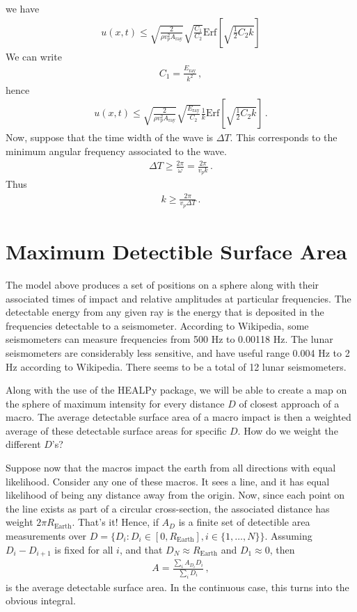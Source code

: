 \documentclass{article}
\newcommand*\te[1]{\text{#1}}
\newcommand*\ps[1]{\left[#1\right]}
\newcommand*\f[2]{\frac{#1}{#2}}
\begin{document}
we have
\begin{align}
u(x,t) \leq \sqrt{\f{2}{\rho v_p^2 A_{\te{ray}}}}\sqrt{\f{C_1}{C_2}}\te{Erf}\ps{\sqrt{\f12 C_2 k}}
\end{align}
We can write
\begin{align}
C_1 = \f{E_\te{ray}}{k^2}\,,
\end{align}
hence
\begin{align}
u(x,t) \leq \sqrt{\f{2}{\rho v_p^2 A_{\te{ray}}}}\sqrt{\f{E_\te{ray}}{C_2}}\f1k\te{Erf}\ps{\sqrt{\f12 C_2 k}}\,.
\end{align}
Now, suppose that the time width of the wave is $\Delta T$. This corresponds to the minimum angular frequency associated to the wave. 
\begin{align}
\Delta T \geq \f{2\pi}{\omega} = \f{2\pi}{v_p k}\,.
\end{align}
Thus
\begin{align}
k \geq\f{2\pi}{v_p\Delta T}\,.
\end{align}
\pagebreak
\section{Maximum Detectible Surface Area}
\indent

The model above produces a set of positions on a sphere along with their associated times of impact and relative amplitudes at particular frequencies. The detectable energy from any given ray is the energy that is deposited in the frequencies detectable to a seismometer. According to Wikipedia, some seismometers can measure frequencies from 500 Hz to 0.00118 Hz. The lunar seismometers are considerably less sensitive, and have useful range 0.004 Hz to 2 Hz according to Wikipedia. There seems to be a total of 12 lunar seismometers.

Along with the use of the HEALPy package, we will be able to create a map on the sphere of maximum intensity for every distance $D$ of closest approach of a macro. The average detectable surface area of a macro impact is then a weighted average of these detectable surface areas for specific $D$. How do we weight the different $D$'s?

Suppose now that the macros impact the earth from all directions with equal likelihood. Consider any one of these macros. It sees a line, and it has equal likelihood of being any distance away from the origin. Now, since each point on the line exists as part of a circular cross-section, the associated distance has weight $2\pi R_{\te{Earth}}$. That's it! Hence, if $A_D$ is a finite set of detectible area measurements over $D = \{D_i:D_i\in[0,R_\te{Earth}],i\in\{1,\dots,N\}\}$. Assuming $D_i - D_{i+1}$ is fixed for all $i$, and that $D_N\approx R_{\te{Earth}}$ and $D_1 \approx 0$, then 
\begin{align}
A=\f{\sum_i A_{D_i}D_i}{\sum_i D_i}\,,
\end{align}
is the average detectable surface area. In the continuous case, this turns into the obvious integral.
\end{document}
